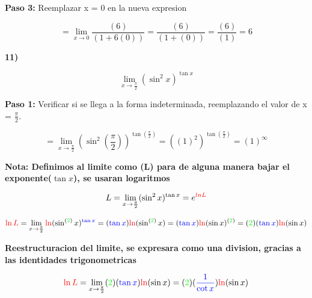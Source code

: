 \documentclass[12pt,a4paper]{article}
\begin{document}
\textbf{Paso 3:}
\vspace{0.2cm}
Reemplazar x = 0 en la nueva expresion

\[
= \lim_{x \to 0} \frac{(6)}{(1 + 6(0))}= \frac{(6)}{(1 + (0))}= \frac{(6)}{(1)}= 6
\]


\newpage


\textbf{11)}

\[
\lim_{x \to \frac{\pi}{2}} (\sin ^2 x)^{\tan x} 
\]

\vspace{0.2cm}

\textbf{Paso 1:}
\vspace{0.2cm}
Verificar si se llega a la forma indeterminada, reemplazando el valor de x = $\frac{\pi}{2}$.

\[
= \lim_{x \to \frac{\pi}{2}} (\sin ^2 (\frac{\pi}{2}))^{\tan (\frac{\pi}{2})} = ((1)^2)^{\tan(\frac{\pi}{2})}= (1)^\infty
\]

\begin{center}
\end{center}

\textbf{Nota: Definimos al limite como (L) para de alguna manera bajar el exponente($\tan x$), se usaran logaritmos }

\[
L = \lim_{x \to  \frac{\pi}{2}} (\sin ^2 x)^{\tan x}= e^{\textcolor{red}{ln L}}
\]


\[
\textcolor{red}{\ln L} = \lim_{x \to  \frac{\pi}{2}} \textcolor{red}{\ln}(\sin ^{(\textcolor{green}{2})} x)^{\textcolor{blue}{\tan x}}=(\textcolor{blue}{\tan x}) \textcolor{red}{\ln}(\sin ^{(\textcolor{green}{2})} x)= (\textcolor{blue}{\tan x}) \textcolor{red}{\ln}(\sin x)^{(\textcolor{green}{2})} = (\textcolor{green}{2})(\textcolor{blue}{\tan x}) \textcolor{red}{\ln}(\sin x)
\]


\textbf{Reestructuracion del limite, se expresara como una division, gracias a las identidades trigonometricas}

\begin{center}
\end{center}

\[
\textcolor{red}{\ln L} = \lim_{x \to  \frac{\pi}{2}} (\textcolor{green}{2})(\textcolor{blue}{\tan x}) \textcolor{red}{\ln}(\sin x)= (\textcolor{green}{2})(\textcolor{blue}{\frac{1}{\cot x}}) \textcolor{red}{\ln}(\sin x)
\]
\end{document}
